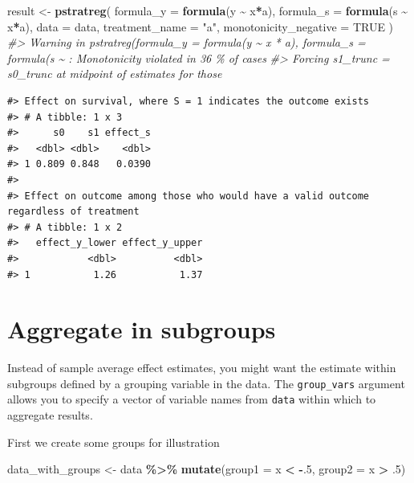 \documentclass[
]{book}
\newenvironment{Shaded}{\begin{snugshade}}{\end{snugshade}}
\newcommand{\AttributeTok}[1]{\textcolor[rgb]{0.13,0.29,0.53}{#1}}
\newcommand{\CommentTok}[1]{\textcolor[rgb]{0.56,0.35,0.01}{\textit{#1}}}
\newcommand{\ConstantTok}[1]{\textcolor[rgb]{0.56,0.35,0.01}{#1}}
\newcommand{\DecValTok}[1]{\textcolor[rgb]{0.00,0.00,0.81}{#1}}
\newcommand{\FunctionTok}[1]{\textcolor[rgb]{0.13,0.29,0.53}{\textbf{#1}}}
\newcommand{\NormalTok}[1]{#1}
\newcommand{\OtherTok}[1]{\textcolor[rgb]{0.56,0.35,0.01}{#1}}
\newcommand{\SpecialCharTok}[1]{\textcolor[rgb]{0.81,0.36,0.00}{\textbf{#1}}}
\newcommand{\StringTok}[1]{\textcolor[rgb]{0.31,0.60,0.02}{#1}}
\begin{document}
\begin{Shaded}
\begin{Highlighting}[]
\NormalTok{result }\OtherTok{\textless{}{-}} \FunctionTok{pstratreg}\NormalTok{(}
  \AttributeTok{formula\_y =} \FunctionTok{formula}\NormalTok{(y }\SpecialCharTok{\textasciitilde{}}\NormalTok{ x}\SpecialCharTok{*}\NormalTok{a),}
  \AttributeTok{formula\_s =} \FunctionTok{formula}\NormalTok{(s }\SpecialCharTok{\textasciitilde{}}\NormalTok{ x}\SpecialCharTok{*}\NormalTok{a),}
  \AttributeTok{data =}\NormalTok{ data,}
  \AttributeTok{treatment\_name =} \StringTok{"a"}\NormalTok{,}
  \AttributeTok{monotonicity\_negative =} \ConstantTok{TRUE}
\NormalTok{)}
\CommentTok{\#\textgreater{} Warning in pstratreg(formula\_y = formula(y \textasciitilde{} x * a), formula\_s = formula(s \textasciitilde{} : Monotonicity violated in 36 \% of cases}
\CommentTok{\#\textgreater{} Forcing s1\_trunc = s0\_trunc at midpoint of estimates for those}
\end{Highlighting}
\end{Shaded}

\begin{verbatim}
#> Effect on survival, where S = 1 indicates the outcome exists
#> # A tibble: 1 x 3
#>      s0    s1 effect_s
#>   <dbl> <dbl>    <dbl>
#> 1 0.809 0.848   0.0390
#> 
#> Effect on outcome among those who would have a valid outcome regardless of treatment
#> # A tibble: 1 x 2
#>   effect_y_lower effect_y_upper
#>            <dbl>          <dbl>
#> 1           1.26           1.37
\end{verbatim}

\section{Aggregate in subgroups}\label{aggregate-in-subgroups}

Instead of sample average effect estimates, you might want the estimate within subgroups defined by a grouping variable in the data. The \texttt{group\_vars} argument allows you to specify a vector of variable names from \texttt{data} within which to aggregate results.

First we create some groups for illustration

\begin{Shaded}
\begin{Highlighting}[]
\NormalTok{data\_with\_groups }\OtherTok{\textless{}{-}}\NormalTok{ data }\SpecialCharTok{\%\textgreater{}\%}
  \FunctionTok{mutate}\NormalTok{(}\AttributeTok{group1 =}\NormalTok{ x }\SpecialCharTok{\textless{}} \SpecialCharTok{{-}}\NormalTok{.}\DecValTok{5}\NormalTok{,}
         \AttributeTok{group2 =}\NormalTok{ x }\SpecialCharTok{\textgreater{}}\NormalTok{ .}\DecValTok{5}\NormalTok{)}
\end{Highlighting}
\end{Shaded}
\end{document}
